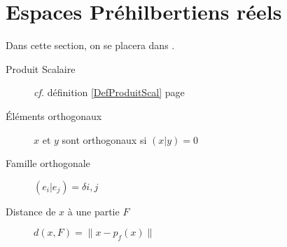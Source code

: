 \documentclass[11pt,a4paper,fleqn,pdftex]{report}
\begin{document}
\chapter{Espaces Préhilbertiens réels}
Dans cette section, on se placera dans \Reel{}.
\begin{methode}
\begin{description}
\item[Produit Scalaire] \textit{cf.} définition \ref{DefProduitScal} page \pageref{DefProduitScal}
\item[Éléments orthogonaux] $x$ et $y$ sont orthogonaux si $( x | y ) = 0 $
\item[Famille orthogonale] $(e_i|e_j) = \delta{i,j}$
\item[Distance de $x$ à une partie $F$] $d(x,F) = \| x - p_f(x) \|$
\end{description}
\end{methode}
\end{document}
